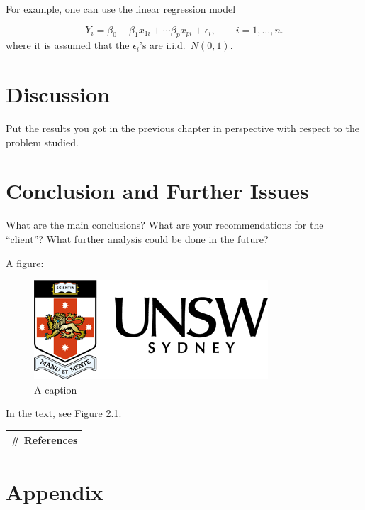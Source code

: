 \documentclass[mstat,12pt]{unswthesis}
\begin{document}
For example, one can use the linear regression model

\[
Y_i = \beta_0 + \beta_1 x_{1i} + \cdots \beta_p x_{pi} + \epsilon_i, \qquad i=1,\ldots,n.
\] where it is assumed that the \(\epsilon_i\)'s are i.i.d.~\(N(0,1)\).

\hypertarget{discussion}{%
\chapter{Discussion}\label{discussion}}

Put the results you got in the previous chapter in perspective with
respect to the problem studied.

\hypertarget{conclusion-and-further-issues}{%
\chapter{Conclusion and Further
Issues}\label{conclusion-and-further-issues}}

What are the main conclusions? What are your recommendations for the
``client''? What further analysis could be done in the future?

A figure:

\begin{figure}[H]
\includegraphics{unsw-logo.png}
\caption{A caption}\label{myfigure}
\end{figure}

In the text, see Figure \ref{myfigure}.

\begin{longtable}[]{@{}l@{}}
\toprule
\endhead
\# References \\
\bottomrule
\end{longtable}




\hypertarget{appendix}{%
\chapter*{Appendix}\label{appendix}}
\end{document}
